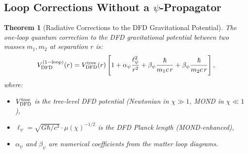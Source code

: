 \documentclass[11pt,a4paper]{article}
\newtheorem{theorem}{Theorem}
\begin{document}
\subsection{Loop Corrections Without a $\psi$-Propagator}

\begin{theorem}[Radiative Corrections to the DFD Gravitational Potential]
\label{thm:loop-corrections}
The one-loop quantum correction to the DFD gravitational potential between two masses $m_1, m_2$ at separation $r$ is:
\begin{equation}\label{eq:V-corrected}
V_{\rm DFD}^{(1-\rm loop)}(r) = V_{\rm DFD}^{\rm tree}(r)\left[1 + \alpha_\psi\frac{\ell_\psi^2}{r^2} + \beta_\psi\frac{\hbar}{m_1 c\,r} + \beta_\psi\frac{\hbar}{m_2 c\,r}\right],
\end{equation}
where:
\begin{itemize}
\item $V_{\rm DFD}^{\rm tree}$ is the tree-level DFD potential (Newtonian in $\chi \gg 1$, MOND in $\chi \ll 1$),
\item $\ell_\psi = \sqrt{G\hbar/c^3}\cdot\mu(\chi)^{-1/2}$ is the DFD Planck length (MOND-enhanced),
\item $\alpha_\psi$ and $\beta_\psi$ are numerical coefficients from the matter loop diagrams.
\end{itemize}
\end{theorem}
\end{document}
